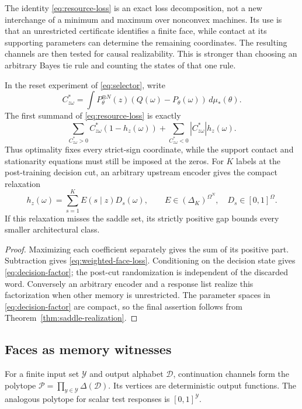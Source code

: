 The identity \eqref{eq:resource-loss} is an exact loss decomposition, not
a new interchange of a minimum and maximum over nonconvex machines.
Its use is that an unrestricted certificate identifies a finite face,
while contact at its supporting parameters can determine the remaining
coordinates. The resulting channels are then tested for causal
realizability. This is stronger than choosing an arbitrary Bayes tie rule
and counting the states of that one rule.

\begin{corollary}
\label{cor:coefficient-face}
In the reset experiment of \eqref{eq:selector}, write
\[
 C^*_{z\omega}=\int P_\theta^{\otimes N}(z)
                  (Q(\omega)-P_\theta(\omega))\,d\mu_*(\theta).
\]
The first summand of \eqref{eq:resource-loss} is exactly
\begin{equation}\label{eq:weighted-face-loss}
 \sum_{C^*_{z\omega}>0}C^*_{z\omega}(1-h_z(\omega))
 +\sum_{C^*_{z\omega}<0}|C^*_{z\omega}|h_z(\omega).
\end{equation}
Thus optimality fixes every strict-sign coordinate, while the support
contact and stationarity equations must still be imposed at the zeros.
For $K$ labels at the post-training decision cut, an arbitrary upstream
encoder gives the compact relaxation
\begin{equation}\label{eq:decision-factor}
 h_z(\omega)=\sum_{s=1}^K E(s\mid z)D_s(\omega),\qquad
 E\in(\Delta_K)^{\Omega^N},\quad D_s\in[0,1]^\Omega.
\end{equation}
If this relaxation misses the saddle set, its strictly positive gap
bounds every smaller architectural class.
\end{corollary}
\begin{proof}
Maximizing each coefficient separately gives the sum of its positive
part. Subtraction gives \eqref{eq:weighted-face-loss}. Conditioning on
the decision state gives \eqref{eq:decision-factor}; the post-cut
randomization is independent of the discarded word. Conversely an
arbitrary encoder and a response list realize this factorization when
other memory is unrestricted. The parameter spaces in
\eqref{eq:decision-factor} are compact, so the final assertion follows
from Theorem~\ref{thm:saddle-realization}.
\end{proof}

\subsection{Faces as memory witnesses}
For a finite input set $\mathcal Y$ and output alphabet $\mathcal D$,
continuation channels form the polytope
$\mathcal P=\prod_{y\in\mathcal Y}\Delta(\mathcal D)$.
Its vertices are deterministic output functions. The analogous
polytope for scalar test responses is $[0,1]^{\mathcal Y}$.

